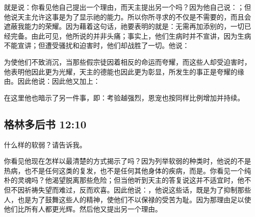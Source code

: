 就是说：你看见他自己提出一个理由，而天主提出另一个吗？因为他自己说：；但他说天主允许这事是为了显示祂的能力。所以你所寻求的不仅是不需要的，而且会遮蔽我能力的荣耀。因为藉着这句话，祂要表明的就是：无需再加添别的，一切已经完备。由此可见，他所说的并非头痛；事实上，他们生病时并不宣讲，因为生病不能宣讲；但遭受骚扰和迫害时，他们却战胜了一切。他说：\par

为使他们不致消沉，当那些假宗徒因着相反的命运而夸耀，而这些人却受迫害时，他表明他因此更为光耀，天主的德能也因此更为彰显，所发生的事正是夸耀的缘由。因此他说：因此他又加上：\par

在这里他也暗示了另一件事，即：考验越强烈，恩宠也按同样比例增加并持续。\par


\subsection{格林多后书 12:10}

什么样的软弱？请告诉我。\par

你看见他现在怎样以最清楚的方式揭示了吗？因为列举软弱的种类时，他说的不是热病，也不是任何这类的复发，也不是任何其他身体的疾病，而是。你看见一个纯朴的灵魂吗？他渴望脱离那些危险；但当他听到天主的答复说这并不适宜时，他不但不因祈祷失望而难过，反而欢喜。因此他说：，他说这些话，既是为了抑制那些人，也是为了鼓舞这些人的精神，使他们不以保禄的受苦为耻。因为那理由足以使他们比所有人都更光辉。然后他又提出另一个理由。\par

